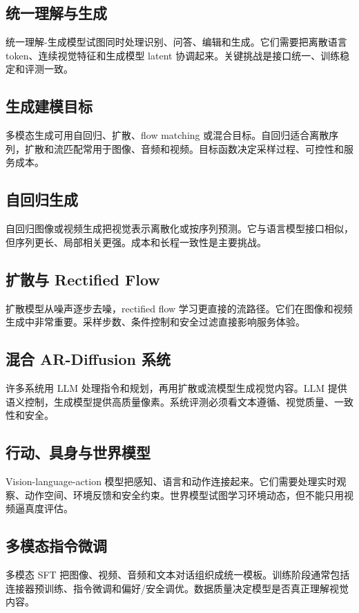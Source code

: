 \documentclass[UTF8,zihao=-4,openany]{ctexbook}
\begin{document}
\subsection{统一理解与生成}
统一理解-生成模型试图同时处理识别、问答、编辑和生成。它们需要把离散语言 token、连续视觉特征和生成模型 latent 协调起来。关键挑战是接口统一、训练稳定和评测一致。

\subsection{生成建模目标}
多模态生成可用自回归、扩散、flow matching 或混合目标。自回归适合离散序列，扩散和流匹配常用于图像、音频和视频。目标函数决定采样过程、可控性和服务成本。

\subsection{自回归生成}
自回归图像或视频生成把视觉表示离散化或按序列预测。它与语言模型接口相似，但序列更长、局部相关更强。成本和长程一致性是主要挑战。

\subsection{扩散与 Rectified Flow}
扩散模型从噪声逐步去噪，rectified flow 学习更直接的流路径。它们在图像和视频生成中非常重要。采样步数、条件控制和安全过滤直接影响服务体验。

\subsection{混合 AR-Diffusion 系统}
许多系统用 LLM 处理指令和规划，再用扩散或流模型生成视觉内容。LLM 提供语义控制，生成模型提供高质量像素。系统评测必须看文本遵循、视觉质量、一致性和安全。

\subsection{行动、具身与世界模型}
Vision-language-action 模型把感知、语言和动作连接起来。它们需要处理实时观察、动作空间、环境反馈和安全约束。世界模型试图学习环境动态，但不能只用视频逼真度评估。

\subsection{多模态指令微调}
多模态 SFT 把图像、视频、音频和文本对话组织成统一模板。训练阶段通常包括连接器预训练、指令微调和偏好/安全调优。数据质量决定模型是否真正理解视觉内容。
\end{document}
